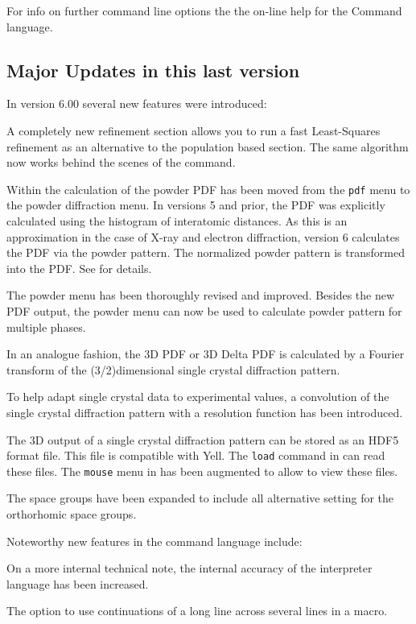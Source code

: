 For info on further command line options the the on-line help for
the Command language.

\subsection{Major Updates in this last version}

In \Suite version 6.00 several new features were introduced:

A completely new refinement section \Refine allows you to run a fast
Least-Squares refinement as an alternative to the population based 
\Diffev section.  The same algorithm now works behind the scenes of the
 command.

Within \Discus the calculation of the powder PDF has been moved from 
the {\tt pdf} menu to the powder diffraction  menu. In versions 5 and 
prior, the PDF was explicitly calculated using the histogram of 
interatomic distances. As this is an approximation in the case of 
X-ray and electron diffraction, \Suite version 6 calculates the 
PDF via the powder pattern. The normalized powder pattern is 
transformed into the PDF. See \cite{neder2020} for details.

The powder menu has been thoroughly revised and improved. Besides the
new PDF output, the powder menu can now be used to calculate powder
pattern for multiple phases. 

In an analogue fashion, the 3D PDF or 3D Delta PDF is calculated 
by a Fourier transform of the (3/2)dimensional single crystal 
diffraction pattern.

To help adapt single crystal data to experimental values, a
convolution of the single crystal diffraction pattern with a
resolution function has been introduced.

The 3D output of a single crystal diffraction pattern can be stored as 
an HDF5 format file. This file is compatible with Yell.
The {\tt load} command in \Kuplot can read these files. The 
{\tt mouse} menu in \Kuplot has been augmented to allow to view these
files.

The space groups have been expanded to include all alternative 
setting for the orthorhomic space groups.

Noteworthy new features in the command language include:

On a more internal technical note, the internal accuracy of the
interpreter language has been increased. 
 
The option to use continuations of a long line across 
several lines in a macro.


